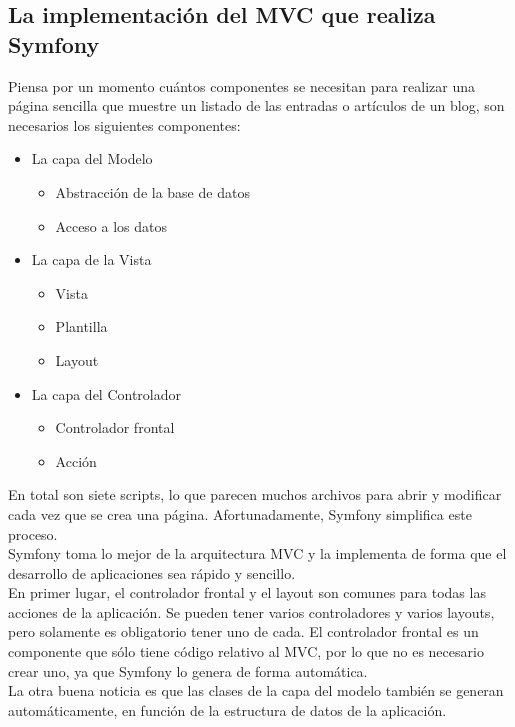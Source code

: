 \subsection{La implementación del MVC que realiza Symfony}
Piensa por un momento cuántos componentes se necesitan para realizar una página sencilla que muestre un listado de las entradas o artículos de un blog, son necesarios los siguientes componentes:
\begin{itemize}
    \item La capa del Modelo
    \begin{itemize}
        \item Abstracción de la base de datos
        \item Acceso a los datos
    \end{itemize}
    \item La capa de la Vista
    \begin{itemize}
        \item Vista
        \item Plantilla
        \item Layout
    \end{itemize}
    \item La capa del Controlador
    \begin{itemize}
        \item Controlador frontal
        \item Acción
    \end{itemize}
\end{itemize}

En total son siete scripts, lo que parecen muchos archivos para abrir y modificar cada vez que se crea una página. Afortunadamente, Symfony simplifica este proceso.\\
Symfony toma lo mejor de la arquitectura MVC y la implementa de forma que el desarrollo de aplicaciones sea rápido y sencillo.\\

En primer lugar, el controlador frontal y el layout son comunes para todas las acciones de la aplicación. Se pueden tener varios controladores y varios layouts, pero solamente es obligatorio tener uno de cada. El controlador frontal es un componente que sólo tiene código relativo al MVC, por lo que no es necesario crear uno, ya que Symfony lo genera de forma automática.\\

La otra buena noticia es que las clases de la capa del modelo también se generan automáticamente, en función de la estructura de datos de la aplicación.\\

